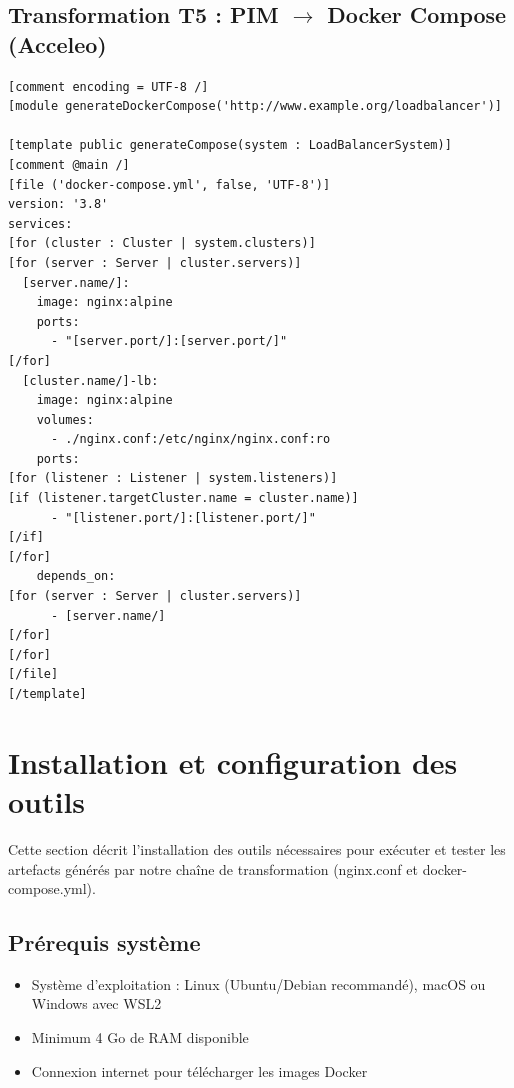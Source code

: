 \documentclass[12pt,a4paper]{report}
\begin{document}
\section{Transformation T5 : PIM $\rightarrow$ Docker Compose (Acceleo)}

\begin{lstlisting}[caption={Template Acceleo pour docker-compose.yml}]
[comment encoding = UTF-8 /]
[module generateDockerCompose('http://www.example.org/loadbalancer')]

[template public generateCompose(system : LoadBalancerSystem)]
[comment @main /]
[file ('docker-compose.yml', false, 'UTF-8')]
version: '3.8'
services:
[for (cluster : Cluster | system.clusters)]
[for (server : Server | cluster.servers)]
  [server.name/]:
    image: nginx:alpine
    ports:
      - "[server.port/]:[server.port/]"
[/for]
  [cluster.name/]-lb:
    image: nginx:alpine
    volumes:
      - ./nginx.conf:/etc/nginx/nginx.conf:ro
    ports:
[for (listener : Listener | system.listeners)]
[if (listener.targetCluster.name = cluster.name)]
      - "[listener.port/]:[listener.port/]"
[/if]
[/for]
    depends_on:
[for (server : Server | cluster.servers)]
      - [server.name/]
[/for]
[/for]
[/file]
[/template]
\end{lstlisting}

\chapter{Installation et configuration des outils}

Cette section décrit l'installation des outils nécessaires pour exécuter et tester les artefacts générés par notre chaîne de transformation (nginx.conf et docker-compose.yml).

\section{Prérequis système}

\begin{itemize}
  \item Système d'exploitation : Linux (Ubuntu/Debian recommandé), macOS ou Windows avec WSL2
  \item Minimum 4 Go de RAM disponible
  \item Connexion internet pour télécharger les images Docker
\end{itemize}
\end{document}
